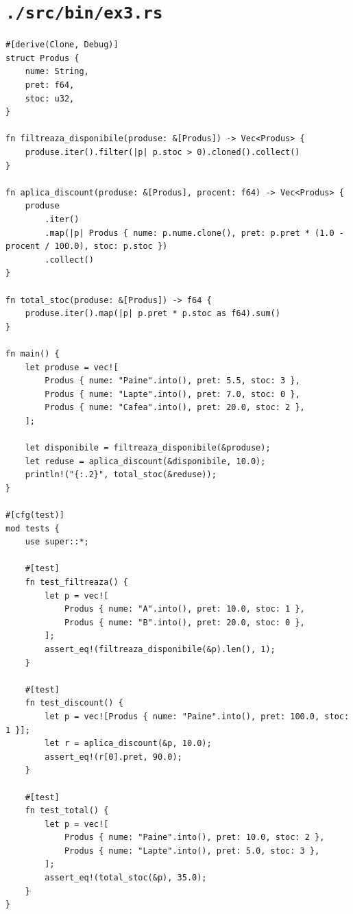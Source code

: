 \documentclass[11pt]{article}
\begin{document}
\section{\texttt{./src/bin/ex3.rs}}
\label{sec:org5405a30}
\begin{verbatim}
#[derive(Clone, Debug)]
struct Produs {
    nume: String,
    pret: f64,
    stoc: u32,
}

fn filtreaza_disponibile(produse: &[Produs]) -> Vec<Produs> {
    produse.iter().filter(|p| p.stoc > 0).cloned().collect()
}

fn aplica_discount(produse: &[Produs], procent: f64) -> Vec<Produs> {
    produse
        .iter()
        .map(|p| Produs { nume: p.nume.clone(), pret: p.pret * (1.0 - procent / 100.0), stoc: p.stoc })
        .collect()
}

fn total_stoc(produse: &[Produs]) -> f64 {
    produse.iter().map(|p| p.pret * p.stoc as f64).sum()
}

fn main() {
    let produse = vec![
        Produs { nume: "Paine".into(), pret: 5.5, stoc: 3 },
        Produs { nume: "Lapte".into(), pret: 7.0, stoc: 0 },
        Produs { nume: "Cafea".into(), pret: 20.0, stoc: 2 },
    ];

    let disponibile = filtreaza_disponibile(&produse);
    let reduse = aplica_discount(&disponibile, 10.0);
    println!("{:.2}", total_stoc(&reduse));
}

#[cfg(test)]
mod tests {
    use super::*;

    #[test]
    fn test_filtreaza() {
        let p = vec![
            Produs { nume: "A".into(), pret: 10.0, stoc: 1 },
            Produs { nume: "B".into(), pret: 20.0, stoc: 0 },
        ];
        assert_eq!(filtreaza_disponibile(&p).len(), 1);
    }

    #[test]
    fn test_discount() {
        let p = vec![Produs { nume: "Paine".into(), pret: 100.0, stoc: 1 }];
        let r = aplica_discount(&p, 10.0);
        assert_eq!(r[0].pret, 90.0);
    }

    #[test]
    fn test_total() {
        let p = vec![
            Produs { nume: "Paine".into(), pret: 10.0, stoc: 2 },
            Produs { nume: "Lapte".into(), pret: 5.0, stoc: 3 },
        ];
        assert_eq!(total_stoc(&p), 35.0);
    }
}
\end{verbatim}
\end{document}
